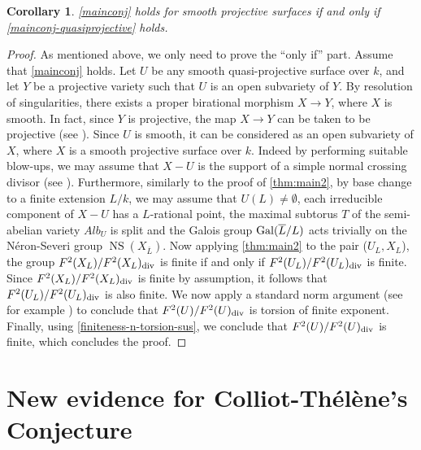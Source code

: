 \documentclass[12pt]{amsart}
\newtheorem{cor}[cor]{Corollary}
\theoremstyle{remark}
\renewcommand{\1}{{\mathbb{S}}}
\newcommand{\Gal}{{\rm Gal}}
\newcommand{\NS}{{\operatorname{NS}}}
\newcommand{\<}{\langle}
\renewcommand{\>}{\rangle}
\newcommand{\dv}{{\rm div}}
\begin{document}
 \begin{cor}\label{maincor}
     \autoref{mainconj} holds for smooth projective surfaces if and only if \autoref{mainconj-quasiprojective} holds.
 \end{cor}




 \begin{proof}
   
As mentioned above, we only need to prove the ``only if'' part. Assume that \autoref{mainconj} holds. Let \( U \) be any smooth quasi-projective surface over \( k \), and let \( Y \) be a projective variety such that $U$ is an open subvariety of $Y$. By resolution of singularities, there exists a proper birational morphism \( X \rightarrow Y \), where \( X \) is smooth. In fact, since \( Y \) is projective, the map \( X \rightarrow Y \) can be taken to be projective (see \cite[Corollary 3.22]{Kol}). Since \( U \) is smooth, it can be considered as an open subvariety of \( X \), where \( X \) is a smooth projective surface over \( k \). Indeed by performing suitable blow-ups, we may assume that \( X - U \) is the support of a simple normal crossing divisor (see \cite[Corollary 0.4]{CJS}). 
Furthermore, similarly to the proof of \autoref{thm:main2}, by base change to a finite extension \( L/k \), we may assume that $U(L)\neq\emptyset$, each irreducible component of $X-U$ has a $L$-rational point, the maximal subtorus $T$ of the semi-abelian variety $Alb_U$ is split and the Galois group $\Gal(\overline{L}/L)$ acts trivially on the N\'{e}ron-Severi group $\NS(X_{\overline{L}})$. 
Now applying  \autoref{thm:main2} to the pair ($U_{L}, X_{L}$), the group
$F^2(X_{L})/F^2(X_{L})_{\dv}$ is finite if and only if $F^2(U_{L})/F^2(U_{L})_{\dv}$ is finite. Since $F^2(X_{L})/F^2(X_{L})_{\dv}$ is finite by assumption, it follows that $F^2(U_{L})/F^2(U_{L})_{\dv}$ is also finite. We now apply a standard norm argument (see for example \cite[Lemma 3.3]{Gaz24}) to conclude that $F^2(U)/F^2(U)_{\dv}$ is torsion of finite exponent. Finally, using \autoref{finiteness-n-torsion-sus}, we conclude that $F^2(U)/F^2(U)_{\dv}$ is finite, which concludes the proof.   

\end{proof}




\section{New evidence for Colliot-Th\'{e}l\`{e}ne's Conjecture}\label{sec:5}
\end{document}
